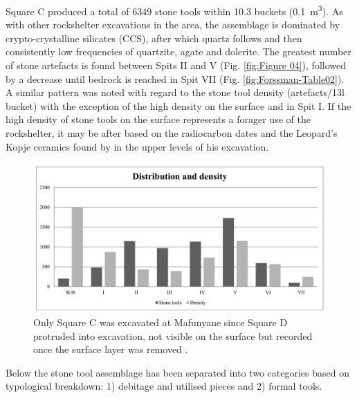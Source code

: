 
Square C  produced a total of \num{6349} stone tools within 10.3 buckets (\SI{0.1}{\meter\cubed}). 
As with other rockshelter excavations in the area, the assemblage is dominated by crypto-crystalline silicates (CCS), after which quartz follows and then consistently low frequencies of quartzite, agate and dolerite. The greatest number of stone artefacts is found between Spits II and V (Fig. \ref{fig:Figure 04}), 
followed by a decrease until bedrock is reached in Spit VII (Fig. \ref{fig:Forssman-Table02}). 
A similar pattern was noted with regard to the stone tool density (artefacts/13l bucket) with the exception of the high density on the surface and in Spit I. If the high density of stone tools on the surface represents a forager use of the rockshelter, it may be after  based on the radiocarbon dates and the Leopard’s Kopje ceramics found by \textcite{Walker_1994} in the upper levels of his excavation. 

	\begin{figure} %
		\includegraphics[width=\linewidth]{figures/Forssman-Figure04}
		\caption{Only Square C was excavated at Mafunyane since Square D protruded into \textcite['s]{Walker_1994} excavation, not visible on the surface but recorded once the surface layer was removed \parencite[from][96]{Forssman_2014a}.}
		\label{fig:Forsmann-Figure04}
	\end{figure}

Below the stone tool assemblage has been separated into two categories based on \textcite['s]{Walker_1994} typological breakdown: 1) debitage and utilised pieces and 2) formal tools.

